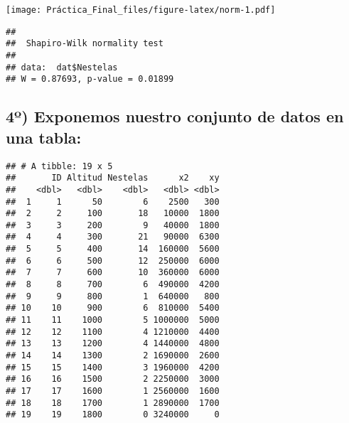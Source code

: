 \documentclass[
]{article}
\newenvironment{Shaded}{\begin{snugshade}}{\end{snugshade}}
\newcommand{\CommentTok}[1]{\textcolor[rgb]{0.56,0.35,0.01}{\textit{#1}}}
\newcommand{\FunctionTok}[1]{\textcolor[rgb]{0.00,0.00,0.00}{#1}}
\newcommand{\NormalTok}[1]{#1}
\newcommand{\OtherTok}[1]{\textcolor[rgb]{0.56,0.35,0.01}{#1}}
\newcommand{\SpecialCharTok}[1]{\textcolor[rgb]{0.00,0.00,0.00}{#1}}
\begin{document}
\texttt{[image: Práctica\_Final\_files/figure-latex/norm-1.pdf]}

\begin{Shaded}
\end{Shaded}

\begin{verbatim}
## 
##  Shapiro-Wilk normality test
## 
## data:  dat$Nestelas
## W = 0.87693, p-value = 0.01899
\end{verbatim}

\hypertarget{uxba-exponemos-nuestro-conjunto-de-datos-en-una-tabla}{%
\subsection{4º) Exponemos nuestro conjunto de datos en una
tabla:}\label{uxba-exponemos-nuestro-conjunto-de-datos-en-una-tabla}}

\begin{Shaded}
\end{Shaded}

\begin{verbatim}
## # A tibble: 19 x 5
##       ID Altitud Nestelas      x2    xy
##    <dbl>   <dbl>    <dbl>   <dbl> <dbl>
##  1     1      50        6    2500   300
##  2     2     100       18   10000  1800
##  3     3     200        9   40000  1800
##  4     4     300       21   90000  6300
##  5     5     400       14  160000  5600
##  6     6     500       12  250000  6000
##  7     7     600       10  360000  6000
##  8     8     700        6  490000  4200
##  9     9     800        1  640000   800
## 10    10     900        6  810000  5400
## 11    11    1000        5 1000000  5000
## 12    12    1100        4 1210000  4400
## 13    13    1200        4 1440000  4800
## 14    14    1300        2 1690000  2600
## 15    15    1400        3 1960000  4200
## 16    16    1500        2 2250000  3000
## 17    17    1600        1 2560000  1600
## 18    18    1700        1 2890000  1700
## 19    19    1800        0 3240000     0
\end{verbatim}
\end{document}
